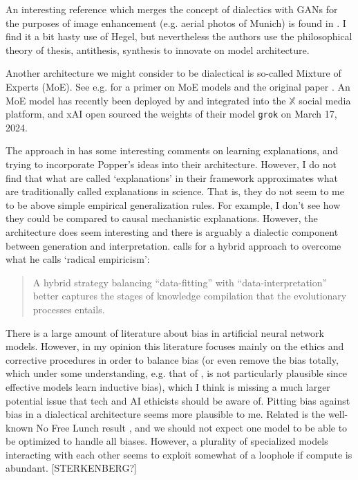 \documentclass[11pt, oneside]{article}   	%
\begin{document}
An interesting reference which merges the concept of dialectics with GANs for the purposes of image enhancement (e.g. aerial photos of Munich) is found in \citep{DialecticalGANS2018}.  I find it a bit hasty use of Hegel, but nevertheless the authors use the philosophical theory of thesis, antithesis, synthesis to innovate on model architecture.


Another architecture we might consider to be dialectical is so-called Mixture of Experts (MoE).  See e.g. \citep{HFMOE} for a primer on MoE models and the original paper \citep{MixtureExperts1991}.  An MoE model has recently been deployed by and integrated into the $\mathbb{X}$ social media platform, and xAI open sourced the weights of their model \texttt{grok} on March 17, 2024.  



The approach in \citep{Norelli2022} has some interesting comments on learning explanations, and trying to incorporate Popper's ideas into their architecture. However, I do not find that what are called `explanations' in their framework approximates what are traditionally called explanations in science.  That is, they do not seem to me to be above simple empirical generalization rules.  For example, I don't see how they could be compared to causal mechanistic explanations.  However, the architecture does seem interesting and there is arguably a dialectic component between generation and interpretation. \citep{Pearl2021} calls for a hybrid approach to overcome what he calls `radical empiricism':

\begin{quote}
    A hybrid strategy balancing ``data-fitting'' with ``data-interpretation'' better captures the stages of knowledge compilation that the evolutionary processes entails. \citep[p. 80]{Pearl2021}
\end{quote}





There is a large amount of literature about bias in artificial neural network models.  However, in my opinion this literature focuses mainly on the ethics and corrective procedures in order to balance bias (or even remove the bias totally, which under some  understanding, e.g. that of \citep{Mitchell1980}, is not particularly plausible since effective models learn inductive bias), which I think is missing a much larger potential issue that tech and AI ethicists should be aware of.  Pitting bias against bias in a dialectical architecture seems more plausible to me.  Related is the well-known No Free Lunch result \citep{Wolpertetal1997}, and we should not expect one model to be able to be optimized to handle all biases.  However, a plurality of specialized models interacting with each other seems to exploit somewhat of a loophole if compute is abundant. [STERKENBERG?]
\end{document}
